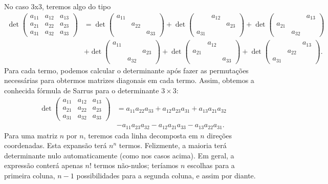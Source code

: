 No caso 3x3, teremos algo do tipo
\begin{align*}
  \det{\begin{pmatrix}
      a_{11} & a_{12} & a_{13}\\
      a_{21} & a_{22} & a_{23}\\
      a_{31} & a_{32} & a_{33}  
    \end{pmatrix}} &= \det{\begin{pmatrix}
      a_{11} &  & \\
      & a_{22} & \\
      &  & a_{33}  
    \end{pmatrix}} + \det{\begin{pmatrix}
      & a_{12} & \\
      & & a_{23} \\
      a_{31} & &  
    \end{pmatrix}} + \det{\begin{pmatrix}
      & & a_{13}\\
      a_{21} & &\\
      &a_{32} &
    \end{pmatrix}} \\
    & + \det{\begin{pmatrix}
      a_{11} &  & \\
      & & a_{23} \\
      & a_{32} &
    \end{pmatrix}} + \det{\begin{pmatrix}
      & a_{12} & \\
       a_{21} & & \\
      &  & a_{33}  
    \end{pmatrix}} + \det{\begin{pmatrix}
      & &a_{13}\\
      & a_{22} & \\
      a_{31} & &  
    \end{pmatrix}}.
\end{align*}
Para cada termo, podemos calcular o determinante após fazer as permutações necessárias para obtermos matrizes diagonais em cada termo. Assim, obtemos a conhecida fórmula de Sarrus para o determinante $3\times 3$:
\begin{align*}
	\det{\begin{pmatrix} a_{11} & a_{12} & a_{13}\\a_{21} & a_{22} & a_{23}\\a_{31} & a_{32} & a_{33}\end{pmatrix}} &= a_{11}a_{22}a_{33}+a_{12}a_{23}a_{31}+a_{13}a_{21}a_{32}\\ &- a_{11}a_{23}a_{32}-a_{12}a_{21}a_{33}-a_{13}a_{22}a_{31}.
\end{align*}
Para uma matriz $n$ por $n$, teremos cada linha decomposta em $n$ direções coordenadas. Esta expansão terá $n^n$ termos. Felizmente, a maioria terá determinante nulo automaticamente (como nos casos acima). Em geral, a expressão conterá apenas $n!$ termos não-nulos; teríamos $n$ escolhas para a primeira coluna, $n-1$ possibilidades para a segunda coluna, e assim por diante. 

